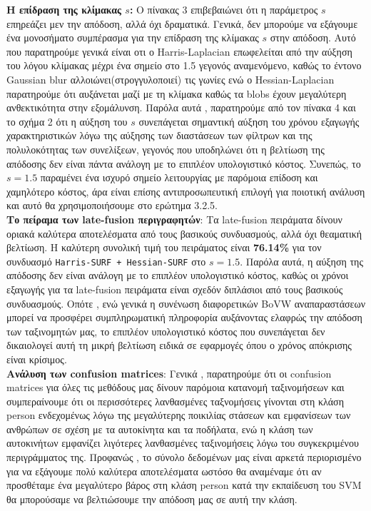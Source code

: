 \documentclass[12pt, a4paper]{article}
\begin{document}
\textbf{Η επίδραση της κλίμακας $s$:}
Ο πίνακας 3 επιβεβαιώνει ότι η παράμετρος $s$
επηρεάζει μεν την απόδοση, αλλά όχι δραματικά. Γενικά, δεν μπορούμε να εξάγουμε ένα μονοσήματο συμπέρασμα για την επίδραση της κλίμακας $s$ στην απόδοση. Αυτό που παρατηρούμε γενικά είναι οτι 
ο Harris-Laplacian επωφελείται από την αύξηση του λόγου κλίμακας μέχρι ένα σημείο στο 1.5 γεγονός αναμενόμενο, καθώς το έντονο Gaussian blur αλλοιώνει(στρογγυλοποιεί) τις γωνίες ενώ ο Hessian-Laplacian παρατηρούμε ότι αυξάνεται μαζί με τη κλίμακα καθώς τα blobs έχουν μεγαλύτερη ανθεκτικότητα στην εξομάλυνση. 
Παρόλα αυτά , παρατηρούμε από τον πίνακα 4 και το σχήμα 2 ότι η αύξηση του $s$ συνεπάγεται σημαντική αύξηση του χρόνου εξαγωγής χαρακτηριστικών λόγω της αύξησης των διαστάσεων των φίλτρων και της πολυλοκότητας των συνελίξεων, γεγονός που υποδηλώνει ότι η βελτίωση της απόδοσης δεν είναι πάντα ανάλογη με το επιπλέον υπολογιστικό κόστος. Συνεπώς,
το $s=1.5$ παραμένει ένα ισχυρό σημείο λειτουργίας με παρόμοια επίδοση και
χαμηλότερο κόστος, άρα είναι επίσης αντιπροσωπευτική επιλογή για ποιοτική
ανάλυση και αυτό θα χρησιμοποιήσουμε στο ερώτημα 3.2.5.\\

\textbf{Το πείραμα των late-fusion περιγραφητών}: Τα late-fusion πειράματα δίνουν οριακά καλύτερα αποτελέσματα από τους βασικούς
συνδυασμούς, αλλά όχι θεαματική βελτίωση. Η καλύτερη συνολική τιμή του
πειράματος είναι \textbf{76.14\%} για τον συνδυασμό
\texttt{Harris-SURF + Hessian-SURF} στο $s=1.5$. Παρόλα αυτά, η αύξηση της απόδοσης δεν είναι ανάλογη με το επιπλέον υπολογιστικό κόστος, καθώς οι χρόνοι εξαγωγής για τα late-fusion πειράματα είναι σχεδόν διπλάσιοι από τους βασικούς συνδυασμούς.
Οπότε , ενώ γενικά η συνένωση διαφορετικών BoVW αναπαραστάσεων μπορεί να προσφέρει συμπληρωματική πληροφορία αυξάνοντας ελαφρώς την απόδοση των ταξινομητών μας, το επιπλέον υπολογιστικό κόστος που συνεπάγεται δεν δικαιολογεί αυτή τη μικρή βελτίωση ειδικά σε εφαρμογές όπου ο χρόνος απόκρισης είναι κρίσιμος.\\

\textbf{Ανάλυση των confusion matrices}: Γενικά , παρατηρούμε ότι οι confusion matrices για όλες τις μεθόδους μας δίνουν παρόμοια κατανομή ταξινομήσεων και συμπεραίνουμε ότι οι περισσότερες λανθασμένες ταξνομήσεις 
γίνονται στη κλάση person ενδεχομένως λόγω της μεγαλύτερης ποικιλίας στάσεων και εμφανίσεων των ανθρώπων σε σχέση με τα αυτοκίνητα και τα ποδήλατα, ενώ η κλάση των αυτοκινήτων εμφανίζει λιγότερες λανθασμένες ταξινομήσεις λόγω του συγκεκριμένου περιγράμματος της. Προφανώς , το σύνολο δεδομένων μας είναι αρκετά περιορισμένο για να εξάγουμε πολύ καλύτερα αποτελέσματα ωστόσο θα αναμέναμε ότι αν προσθέταμε ένα μεγαλύτερο βάρος στη κλάση person κατά την εκπαίδευση του SVM θα μπορούσαμε να βελτιώσουμε την απόδοση μας σε αυτή την κλάση.
\end{document}
